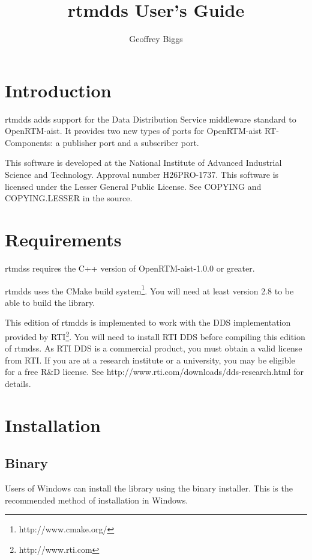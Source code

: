 \documentclass[a4paper,10pt]{article}
\title{rtmdds User's Guide}
\author{Geoffrey Biggs}
\begin{document}
\maketitle

\section{Introduction}
\label{sec:intro}

rtmdds adds support for the Data Distribution Service middleware
standard to OpenRTM-aist. It provides two new types of ports for
OpenRTM-aist RT-Components: a publisher port and a subscriber port.

This software is developed at the National Institute of Advanced Industrial
Science and Technology. Approval number H26PRO-1737. This software is licensed
under the Lesser General Public License. See COPYING and COPYING.LESSER in the
source.

\section{Requirements}
\label{sec:requirements}

rtmdss requires the C++ version of OpenRTM-aist-1.0.0 or greater.

rtmdds uses the CMake build system\footnote{http://www.cmake.org/}. You
will need at least version 2.8 to be able to build the library.

This edition of rtmdds is implemented to work with the DDS implementation
provided by RTI\footnote{http://www.rti.com}. You will need to install RTI DDS
before compiling this edition of rtmdss. As RTI DDS is a commercial product,
you must obtain a valid license from RTI. If you are at a research institute or
a university, you may be eligible for a free R\&D license. See
http://www.rti.com/downloads/dds-research.html for details.

\section{Installation}
\label{sec:installation}

\subsection{Binary}

Users of Windows can install the library using the binary installer.
This is the recommended method of installation in Windows.
\end{document}
